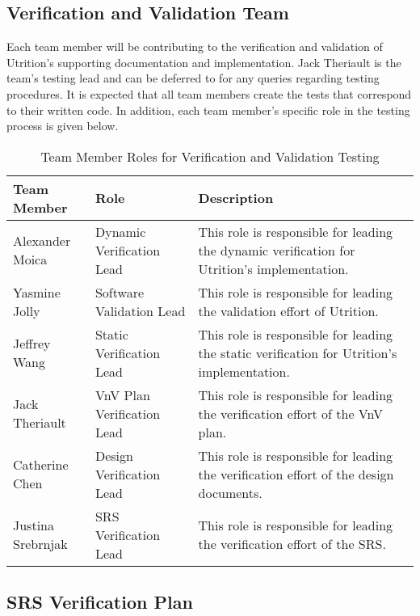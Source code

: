 \documentclass[12pt, titlepage]{article}
\begin{document}
	\subsection{Verification and Validation Team}
	
	
	Each team member will be contributing to the verification and validation of Utrition's supporting documentation and implementation. Jack Theriault is the team's testing lead and can be deferred to for any queries regarding testing procedures. It is expected that all team members create the tests that correspond to their written code. In addition, each team member's specific role in the testing process is given below.
	
	\begin{table}[H]
		\centering
		\label{Table:Testing_Roles}
		\begin{tabular}{|p{3.2cm}|p{4cm}|p{5.5cm}|}
			\hline
			\textbf{Team Member} & \textbf{Role} & \textbf{Description}\\ \hline
			Alexander Moica& Dynamic Verification Lead& This role is responsible for leading the dynamic verification for Utrition's implementation.\\ \hline
			Yasmine Jolly& Software Validation Lead & This role is responsible for leading the validation effort of Utrition.\\ \hline
			Jeffrey Wang& Static Verification Lead & This role is responsible for leading the static verification for Utrition's implementation.\\ \hline
			Jack Theriault& VnV Plan Verification Lead& This role is responsible for leading the verification effort of the VnV plan.\\ \hline
			Catherine Chen& Design Verification Lead& This role is responsible for leading the verification effort of the design documents.\\ \hline
			Justina Srebrnjak& SRS Verification Lead& This role is responsible for leading the verification effort of the SRS. \\ \hline
		\end{tabular}
		\caption{Team Member Roles for Verification and Validation Testing}
	\end{table} 
	
	\subsection{SRS Verification Plan}
	
\end{document}
